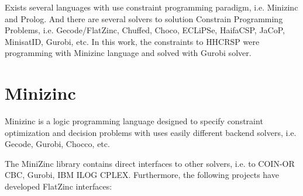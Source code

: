 Exists several languages with use constraint programming paradigm, i.e. Minizinc and Prolog. And there are several solvers to solution Constrain Programming Problems, i.e. Gecode/FlatZinc, Chuffed, Choco, ECLiPSe, HaifaCSP, JaCoP, MinisatID,  Gurobi, etc.  
In this work, the constraints to \ac{HHCRSP} were programming with Minizinc language and solved with Gurobi solver.

\section{Minizinc}

Minizinc is a logic programming language designed to specify constraint optimization and decision problems with uses easily different backend solvers, i.e. Gecode, Gurobi, Chocco, etc. 

The MiniZinc library contains direct interfaces to other solvers, i.e. to COIN-OR CBC, Gurobi, IBM ILOG CPLEX. Furthermore, the following projects have developed FlatZinc interfaces:

